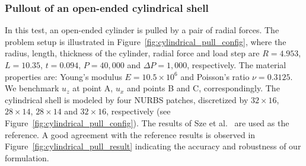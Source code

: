\subsubsection{Pullout of an open-ended cylindrical shell}

In this test, an open-ended cylinder is pulled by a pair of radial forces. The problem setup is illustrated in Figure~\ref{fig:cylindrical_pull_config}, where the radius, length, thickness of the cylinder, radial force and load step are $R = 4.953$, $L = 10.35$, $t = 0.094$, $P = 40,000$ and $\Delta P = 1,000$, respectively. The material properties are: Young's modulus $E = 10.5\times 10^6$ and Poisson's ratio $\nu = 0.3125$. We benchmark $u_z$ at point A, $u_x$ and points B and C, correspondingly. The cylindrical shell is modeled by four NURBS patches, discretized by $32\times 16$, $28\times 14$, $28\times 14$ and $32\times 16$, respectively (see Figure~\ref{fig:cylindrical_pull_config}). The results of Sze et al.~\cite{sze2004popular} are used as the reference. A good agreement with the reference results is observed in Figure~\ref{fig:cylindrical_pull_result} indicating the accuracy and robustness of our formulation.

